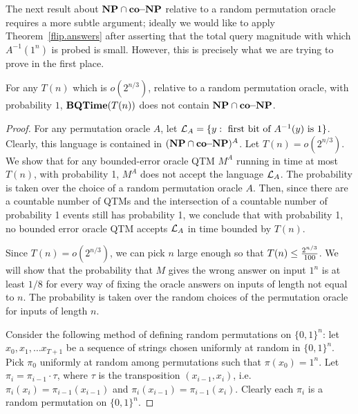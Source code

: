 The next result about $\mbox{\bf NP} \cap \mbox{\bf co--NP}$ relative to a random
permutation oracle requires a more subtle argument; ideally
we would like to apply Theorem~\ref{flip.answers} after asserting that
the total query magnitude with which $A^{-1}(1^n)$ is
probed is small.  However, this is precisely what we are
trying to prove in the first place.

\begin{theorem}\label{notCoNP}
For any $T(n)$ which is $o(2^{n/3})$, relative to a random permutation
oracle,
with probability $1$, $\mbox{\bf BQTime}(T(n))$
does not contain $\mbox{\bf NP} \cap \mbox{\bf co--NP}$.
\end{theorem}

\begin{proof}
For any permutation oracle $A$, let
${\cal L}_A = \{y: \mbox{~first~bit~of~}A^{-1}(y) \mbox{~is~} 1 \}$.
Clearly, this language is contained in $(\mbox{\bf NP} \cap \mbox{\bf co--NP})^A$.
Let $T(n) = o(2^{n/3})$. We show that for any
bounded-error oracle QTM $M^A$ running in time at most $T(n)$,
with probability 1, $M^A$ does not accept the language ${\cal L}_A$.
The probability is taken over the choice of a random permutation
oracle $A$.
Then, since there are a countable number of QTMs
and the intersection of a countable number of probability 1 events
still has probability 1, we conclude that with probability 1,
no bounded error oracle
QTM accepts ${\cal L}_A$ in time bounded by $T(n)$.

Since $T(n) = o(2^{n/3})$, we can pick $n$ large enough so that
$T(n) \leq {2^{n/3} \over 100}$.
We will show that the probability
that $M$ gives the wrong answer on input $1^n$ is at least
$1/8$ for every way of fixing the oracle answers on
inputs of length not equal to $n$. The probability is taken over
the random choices of the permutation
oracle for inputs of length $n$.

Consider the following method of defining random permutations
on $\{ 0,1 \}^n$: let $x_0 , x_1 , \ldots x_{T+1}$ be a sequence of
strings chosen uniformly at random in $\{ 0, 1 \}^n$. Pick
$\pi_0$ uniformly at random among permutations such
that $\pi(x_0) = 1^n$. Let $\pi_i = \pi_{i-1} \cdot \tau$,
where $\tau$ is the transposition $(x_{i-1} , x_i )$,
i.e.~$\pi_i (x_i) = \pi_{i-1} (x_{i-1})$ and
$\pi_i (x_{i-1}) = \pi_{i-1} (x_{i})$. Clearly each $\pi_i$ is
a random permutation on $\{ 0,1\}^n$.


\end{proof}
